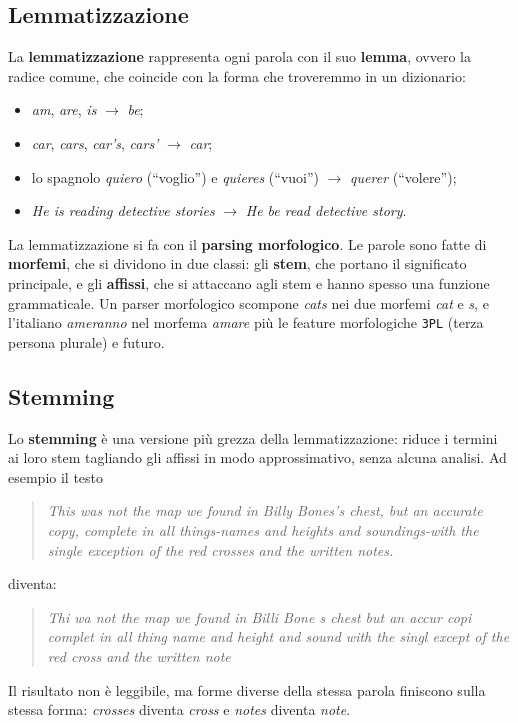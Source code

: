 \subsection{Lemmatizzazione}
La \textbf{lemmatizzazione} rappresenta ogni parola con il suo \textbf{lemma}, ovvero la radice comune, che coincide con la forma che troveremmo in un dizionario:
\begin{itemize}
    \item \textit{am}, \textit{are}, \textit{is} $\to$ \textit{be};
    \item \textit{car}, \textit{cars}, \textit{car's}, \textit{cars'} $\to$ \textit{car};
    \item lo spagnolo \textit{quiero} (\enquote{voglio}) e \textit{quieres} (\enquote{vuoi}) $\to$ \textit{querer} (\enquote{volere});
    \item \textit{He is reading detective stories} $\to$ \textit{He be read detective story}.
\end{itemize}

La lemmatizzazione si fa con il \textbf{parsing morfologico}. Le parole sono fatte di \textbf{morfemi}, che si dividono in due classi: gli \textbf{stem}, che portano il significato principale, e gli \textbf{affissi}, che si attaccano agli stem e hanno spesso una funzione grammaticale. Un parser morfologico scompone \textit{cats} nei due morfemi \textit{cat} e \textit{s}, e l'italiano \textit{ameranno} nel morfema \textit{amare} più le feature morfologiche \texttt{3PL} (terza persona plurale) e futuro.

\subsection{Stemming}
Lo \textbf{stemming} è una versione più grezza della lemmatizzazione: riduce i termini ai loro stem tagliando gli affissi in modo approssimativo, senza alcuna analisi. Ad esempio il testo
\begin{quote}
\textit{This was not the map we found in Billy Bones's chest, but an accurate copy, complete in all things-names and heights and soundings-with the single exception of the red crosses and the written notes.}
\end{quote}
diventa:
\begin{quote}
\textit{Thi wa not the map we found in Billi Bone s chest but an accur copi complet in all thing name and height and sound with the singl except of the red cross and the written note}
\end{quote}
Il risultato non è leggibile, ma forme diverse della stessa parola finiscono sulla stessa forma: \textit{crosses} diventa \textit{cross} e \textit{notes} diventa \textit{note}.

